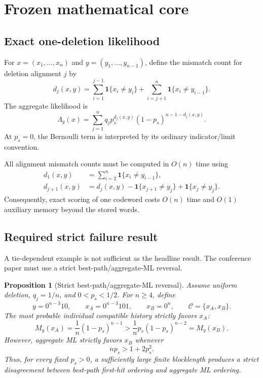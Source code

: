 \documentclass[11pt]{article}
\newtheorem{proposition}[theorem]{Proposition}
\theoremstyle{definition}
\theoremstyle{remark}
\newcommand{\C}{\mathcal{C}}
\newcommand{\ind}{\mathbf{1}}
\begin{document}
\section{Frozen mathematical core}

\subsection{Exact one-deletion likelihood}

For $x=(x_1,\ldots,x_n)$ and $y=(y_1,\ldots,y_{n-1})$, define the mismatch count for deletion alignment $j$ by
\begin{equation}
 d_j(x,y)=
 \sum_{i=1}^{j-1}\ind\{x_i\ne y_i\}
 +\sum_{i=j+1}^{n}\ind\{x_i\ne y_{i-1}\}.
 \label{eq:dj}
\end{equation}
The aggregate likelihood is
\begin{equation}
\boxed{
\Lambda_y(x)=
\sum_{j=1}^{n}q_j
p_s^{d_j(x,y)}(1-p_s)^{n-1-d_j(x,y)}.}
\label{eq:likelihood}
\end{equation}
At $p_s=0$, the Bernoulli term is interpreted by its ordinary indicator/limit convention.

All alignment mismatch counts must be computed in $O(n)$ time using
\begin{align}
 d_1(x,y)
 &=\sum_{i=2}^{n}\ind\{x_i\ne y_{i-1}\},\\
 d_{j+1}(x,y)
 &=d_j(x,y)
 -\ind\{x_{j+1}\ne y_j\}
 +\ind\{x_j\ne y_j\}.
 \label{eq:recurrence}
\end{align}
Consequently, exact scoring of one codeword costs $O(n)$ time and $O(1)$ auxiliary memory beyond the stored words.

\subsection{Required strict failure result}

A tie-dependent example is not sufficient as the headline result. The conference paper must use a strict best-path/aggregate-ML reversal.

\begin{proposition}[Strict best-path/aggregate-ML reversal]
\label{prop:strict}
Assume uniform deletion, $q_j=1/n$, and $0<p_s<1/2$. For $n\ge4$, define
\[
y=0^{n-3}10,
\qquad
x_A=0^{n-3}101,
\qquad
x_B=0^n,
\qquad
\C=\{x_A,x_B\}.
\]
The most probable individual compatible history strictly favors $x_A$:
\[
M_y(x_A)=\frac1n(1-p_s)^{n-1}
>
\frac1n p_s(1-p_s)^{n-2}=M_y(x_B).
\]
However, aggregate ML strictly favors $x_B$ whenever
\begin{equation}
np_s>1+2p_s^2.
\label{eq:reversal-condition}
\end{equation}
Thus, for every fixed $p_s>0$, a sufficiently large finite blocklength produces a strict disagreement between best-path first-hit ordering and aggregate ML ordering.
\end{proposition}
\end{document}
